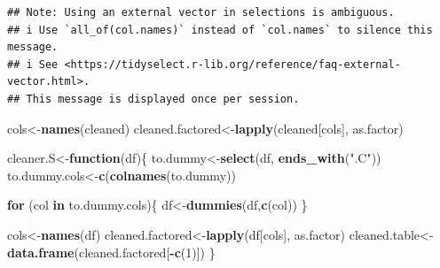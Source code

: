 \documentclass[
]{article}
\newenvironment{Shaded}{\begin{snugshade}}{\end{snugshade}}
\newcommand{\CommentTok}[1]{\textcolor[rgb]{0.56,0.35,0.01}{\textit{#1}}}
\newcommand{\ControlFlowTok}[1]{\textcolor[rgb]{0.13,0.29,0.53}{\textbf{#1}}}
\newcommand{\DecValTok}[1]{\textcolor[rgb]{0.00,0.00,0.81}{#1}}
\newcommand{\KeywordTok}[1]{\textcolor[rgb]{0.13,0.29,0.53}{\textbf{#1}}}
\newcommand{\NormalTok}[1]{#1}
\newcommand{\OperatorTok}[1]{\textcolor[rgb]{0.81,0.36,0.00}{\textbf{#1}}}
\newcommand{\StringTok}[1]{\textcolor[rgb]{0.31,0.60,0.02}{#1}}
\begin{document}
\begin{verbatim}
## Note: Using an external vector in selections is ambiguous.
## i Use `all_of(col.names)` instead of `col.names` to silence this message.
## i See <https://tidyselect.r-lib.org/reference/faq-external-vector.html>.
## This message is displayed once per session.
\end{verbatim}

\begin{Shaded}
\begin{Highlighting}[]
\NormalTok{cols<-}\KeywordTok{names}\NormalTok{(cleaned)}
\NormalTok{cleaned.factored<-}\KeywordTok{lapply}\NormalTok{(cleaned[cols], as.factor)}
\end{Highlighting}
\end{Shaded}

\begin{Shaded}
\begin{Highlighting}[]
\NormalTok{cleaner.S<-}\ControlFlowTok{function}\NormalTok{(df)\{}
\NormalTok{  to.dummy<-}\KeywordTok{select}\NormalTok{(df, }\KeywordTok{ends_with}\NormalTok{(}\StringTok{".C"}\NormalTok{))}
\NormalTok{  to.dummy.cols<-}\KeywordTok{c}\NormalTok{(}\KeywordTok{colnames}\NormalTok{(to.dummy))}
  
  
  \ControlFlowTok{for}\NormalTok{ (col }\ControlFlowTok{in}\NormalTok{ to.dummy.cols)\{}
\NormalTok{    df<-}\KeywordTok{dummies}\NormalTok{(df,}\KeywordTok{c}\NormalTok{(col))}
\NormalTok{  \}}
  
 
\NormalTok{  cols<-}\KeywordTok{names}\NormalTok{(df)}
\NormalTok{  cleaned.factored<-}\KeywordTok{lapply}\NormalTok{(df[cols], as.factor)}
\NormalTok{  cleaned.table<-}\KeywordTok{data.frame}\NormalTok{(cleaned.factored[}\OperatorTok{-}\KeywordTok{c}\NormalTok{(}\DecValTok{1}\NormalTok{)])}
\NormalTok{\}}
\end{Highlighting}
\end{Shaded}

\begin{Shaded}
\end{Shaded}
\end{document}
